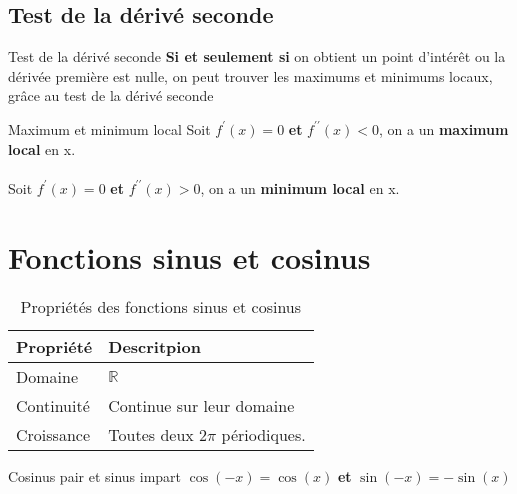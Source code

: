 \documentclass[2pt]{report}
\begin{document}
\begin{multicols*}{3}
\section{Test de la dérivé seconde}
\begin{Concept}{Test de la dérivé seconde}{}
\textbf{Si et seulement si} on obtient un point d'intérêt ou la dérivée première est nulle, on peut trouver 
les maximums et minimums locaux, grâce au test de la dérivé seconde    
\end{Concept}

\begin{Definitionx*}{Maximum et minimum local}{}
  Soit $f^{\prime}\left(x\right) = 0$ \textcolor{myb}{\textbf{et}} $f^{\prime\prime}\left(x\right) < 0$, on a  
  un \textbf{maximum local} en x. \\\\
    Soit $f^{\prime}\left(x\right) = 0$ \textcolor{myb}{\textbf{et}} $f^{\prime\prime}\left(x\right) > 0$, on a  
  un \textbf{minimum local} en x.
\end{Definitionx*}

\chapter{Fonctions sinus et cosinus}
\begin{table}[H]
  \caption {Propriétés des fonctions sinus et cosinus}

  \begin{center}
    \renewcommand{\arraystretch}{1.5}
    \selectfont
    \footnotesize
    \begin{tabular}{l|l}
    \arrayrulecolor{blue}\hline
    \rowcolor{lightBlue}
    \textcolor{myb}{Propriété} & \textcolor{myb}{Descritpion}
    \\
    \hline
    \arrayrulecolor{black}
Domaine
& 
$\mathbb{R}$
\\
\hline
Continuité
&
Continue sur leur domaine  
\\
\hline
Croissance 
&
Toutes deux $2\pi$ périodiques. 
\\
\hline
\end{tabular}
\end{center}
\end{table}

\begin{Identite}{Cosinus pair et sinus impart}{}
  $\cos\left(-x\right) = \cos\left(x\right)$ \textcolor{myb}{\textbf{et}} 
  $\sin\left(-x\right) = -\sin\left(x\right)$
\end{Identite}


\end{multicols*}
\end{document}
